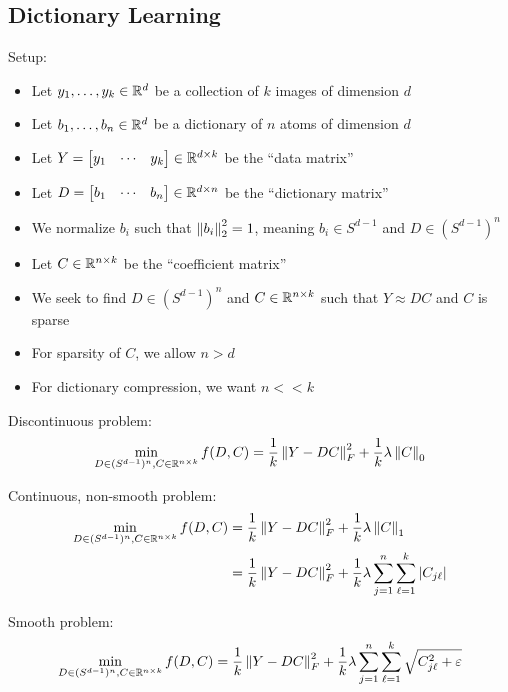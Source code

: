 \subsection{Dictionary Learning}
Setup:
\begin{itemize}
    \item Let $y_1,\dots,y_k \in \mathbb{R}^{d}$ be a collection of $k$ images of dimension $d$
    \item Let $b_1,\dots,b_n \in \mathbb{R}^{d}$ be a dictionary of $n$ atoms of dimension $d$
    \item Let $Y = \begin{bmatrix}
        y_1 & \cdots & y_k
    \end{bmatrix} \in \mathbb{R}^{d\times k}$ be the ``data matrix''
    \item Let $D = \begin{bmatrix}
        b_1 & \cdots & b_n
    \end{bmatrix} \in\mathbb{R}^{d\times n}$ be the ``dictionary matrix''
    \item We normalize $b_i$ such that $\left\lVert b_i \right\rVert_2^2 = 1$, meaning $b_i\in S^{d-1}$ and $D\in(S^{d-1})^n$
    \item Let $C\in\mathbb{R}^{n\times k}$ be the ``coefficient matrix''
    \item We seek to find $D\in(S^{d-1})^n$ and $C\in\mathbb{R}^{n\times k}$ such that $Y\approx DC$ and $C$ is sparse 
    \item For sparsity of $C$, we allow $n > d$
    \item For dictionary compression, we want $n << k$
\end{itemize}

Discontinuous problem:
\begin{equation}
    \min_{D\in(S^{d-1})^n, C\in\mathbb{R}^{n\times k}} f(D,C) 
    = \frac{1}{k} \left\lVert Y-DC \right\rVert_F^2 + \frac{1}{k} \lambda \left\lVert C \right\rVert_0
\end{equation}

Continuous, non-smooth problem:
\begin{align}
    \min_{D\in(S^{d-1})^n, C\in\mathbb{R}^{n\times k}} f(D,C)
    &= \frac{1}{k} \left\lVert Y-DC \right\rVert_F^2 + \frac{1}{k} \lambda \left\lVert C \right\rVert_1
    \\
    &= \frac{1}{k} \left\lVert Y-DC \right\rVert_F^2 + \frac{1}{k} \lambda \sum_{j=1}^n \sum_{\ell=1}^k |C_{j\ell}|
\end{align}

Smooth problem:
\begin{align}
    \min_{D\in(S^{d-1})^n, C\in\mathbb{R}^{n\times k}} f(D,C) 
    = \frac{1}{k} \left\lVert Y-DC \right\rVert_F^2 + \frac{1}{k} \lambda \sum_{j=1}^n \sum_{\ell=1}^k \sqrt{C_{j\ell}^2 + \varepsilon}
\end{align}


